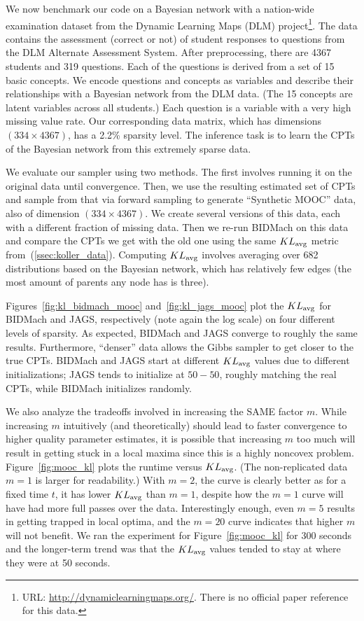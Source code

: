 \documentclass{article} %
\begin{document}
We now benchmark our code on a Bayesian network with a nation-wide examination dataset from the
Dynamic Learning Maps (DLM) project\footnote{URL: \url{http://dynamiclearningmaps.org/}. There is no
official paper reference for this data.}. The data contains the assessment (correct or not) of
student responses to questions from the DLM Alternate Assessment System. After preprocessing, there
are 4367 students and 319 questions. Each of the questions is derived from a set of 15 basic
concepts. We encode questions and concepts as variables and describe their relationships with a
Bayesian network from the DLM data. (The 15 concepts are latent variables across all students.) Each
question is a variable with a very high missing value rate.  Our corresponding data matrix, which
has dimensions $(334\times 4367)$, has a 2.2\% sparsity level. The inference task is to learn the
CPTs of the Bayesian network from this extremely sparse data.

We evaluate our sampler using two methods. The first involves running it on the original data until
convergence. Then, we use the resulting estimated set of CPTs and sample from that via forward
sampling to generate ``Synthetic MOOC'' data, also of dimension $(334 \times 4367)$. We create
several versions of this data, each with a different fraction of missing data. Then we re-run
BIDMach on this data and compare the CPTs we get with the old one using the same $KL_{\rm avg}$
metric from~(\ref{ssec:koller_data}). Computing $KL_{\rm avg}$ involves averaging over 682
distributions based on the Bayesian network, which has relatively few edges (the most amount of
parents any node has is three).

Figures~\ref{fig:kl_bidmach_mooc} and~\ref{fig:kl_jags_mooc} plot the $KL_{\rm avg}$ for BIDMach and
JAGS, respectively (note again the log scale) on four different levels of sparsity. As expected,
BIDMach and JAGS converge to roughly the same results. Furthermore, ``denser'' data allows the Gibbs
sampler to get closer to the true CPTs. BIDMach and JAGS start at different $KL_{\rm avg}$ values
due to different initializations; JAGS tends to initialize at $50-50$, roughly matching the real
CPTs, while BIDMach initializes randomly.

We also analyze the tradeoffs involved in increasing the SAME factor $m$. While increasing $m$
intuitively (and theoretically) should lead to faster convergence to higher quality parameter
estimates, it is possible that increasing $m$ too much will result in getting stuck in a local
maxima since this is a highly noncovex problem. Figure~\ref{fig:mooc_kl} plots the runtime versus
$KL_{\rm avg}$. (The non-replicated data $m=1$ is larger for readability.) With $m=2$, the curve is
clearly better as for a fixed time $t$, it has lower $KL_{\rm avg}$ than $m=1$, despite how the
$m=1$ curve will have had more full passes over the data. Interestingly enough, even $m=5$ results
in getting trapped in local optima, and the $m=20$ curve indicates that higher $m$ will not benefit.
We ran the experiment for Figure~\ref{fig:mooc_kl} for 300 seconds and the longer-term trend was
that the $KL_{\rm avg}$ values tended to stay at where they were at 50 seconds.
\end{document}
